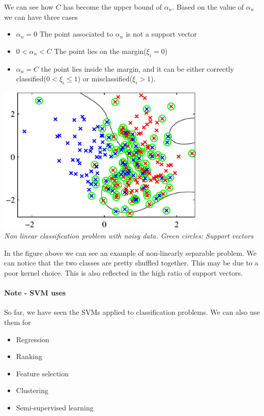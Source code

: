 \documentclass[main.tex]{subfiles}
\begin{document}
We can see how $C$ has become the upper bound of $\alpha_n$. Based on the value of $\alpha_n$ we can have three cases
\begin{itemize}
    \item $\alpha_n = 0$ The point associated to $\alpha_n$ is not a support vector
    \item $0 < \alpha_n < C$ The point lies on the margin($\xi_i = 0$)
    \item $\alpha_n = C$ the point lies inside the margin, and it can be either correctly classified($0 < \xi_i \leq 1$) or misclassified($\xi_i > 1$)\footnotemark. 
\end{itemize}
\begin{center}
    \includegraphics[width=100mm]{img/SVM_Noisy.PNG} \\
    \textit{Non linear classification problem with noisy data. Green circles: Support vectors}\\
\end{center}
In the figure above we can see an example of non-linearly separable problem. We can notice that the two classes are pretty shuffled together. This may be due to a poor kernel choice. This is also reflected in the high ratio of support vectors.
\paragraph{Note - SVM uses} So far, we have seen the SVMs applied to classification problems. We can also use them for
\begin{itemize}
    \item Regression
    \item Ranking
    \item Feature selection
    \item Clustering
    \item Semi-supervised learning
\end{itemize}

\newpage
\end{document}
